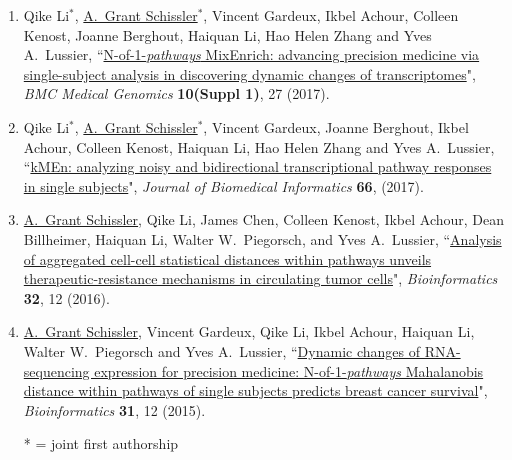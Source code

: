 \documentclass[paper=a4,fontsize=11pt]{scrartcl} %
\newcommand{\PaperEntry}[7]{
		\noindent #1, ``\href{#7}{#2}", \textit{#3} \textbf{#4}, #5 (#6).}
\begin{document}
\begin{enumerate}
\item \PaperEntry{Qike Li$^{*}$, \underline{A.~Grant Schissler$^{*}$}, Vincent Gardeux, Ikbel Achour, Colleen Kenost, Joanne Berghout, Haiquan Li, Hao Helen Zhang and Yves A.~Lussier}{N-of-1-\emph{pathways} MixEnrich: advancing precision medicine via single-subject analysis in discovering dynamic changes of transcriptomes}{BMC Medical Genomics}{10(Suppl 1)}{27}{2017}{https://bmcmedgenomics.biomedcentral.com/articles/10.1186/s12920-017-0263-4}

\item \PaperEntry{Qike Li$^{*}$, \underline{A.~Grant Schissler}$^{*}$, Vincent Gardeux, Joanne Berghout, Ikbel Achour, Colleen Kenost, Haiquan Li, Hao Helen Zhang and Yves A.~Lussier}{kMEn: analyzing noisy and bidirectional transcriptional pathway responses in single subjects}{Journal of Biomedical Informatics}{66}{}{2017}{http://www.sciencedirect.com/science/article/pii/S1532046416301836}

\item \PaperEntry{\underline{A.~Grant Schissler}, Qike Li, James Chen, Colleen Kenost, Ikbel Achour, Dean Billheimer, Haiquan Li, Walter W.~Piegorsch, and Yves A.~Lussier}{Analysis of aggregated cell-cell statistical distances within pathways unveils therapeutic-resistance mechanisms in circulating tumor cells}{Bioinformatics}{32}{12}{2016}{http://bioinformatics.oxfordjournals.org/content/32/12/i80.full}

\item \PaperEntry{\underline{A.~Grant Schissler}, Vincent Gardeux, Qike Li, Ikbel Achour, Haiquan Li, Walter W.~Piegorsch and Yves A.~Lussier}{Dynamic changes of RNA-sequencing expression for precision medicine: N-of-1-\textit{pathways} Mahalanobis distance within pathways of single subjects predicts breast cancer survival}{Bioinformatics}{31}{12}{2015}{http://bioinformatics.oxfordjournals.org/content/31/12/i293.full}

  * = joint first authorship
\end{enumerate}

\end{document}
